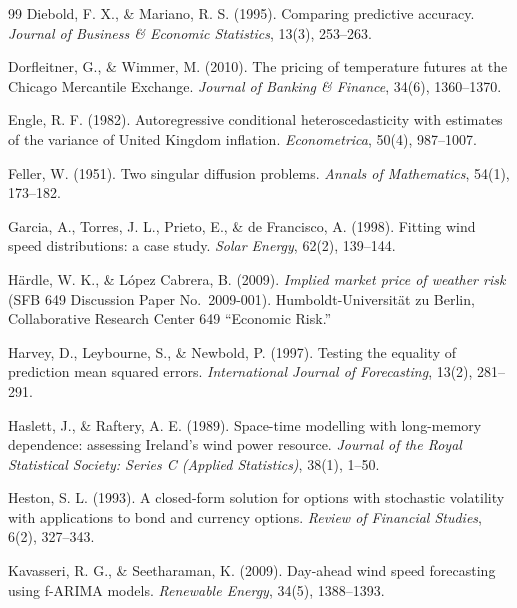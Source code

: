 \begin{thebibliography}{99}
Diebold, F. X., \& Mariano, R. S. (1995).
Comparing predictive accuracy.
\textit{Journal of Business \& Economic Statistics}, 13(3), 253--263.

Dorfleitner, G., \& Wimmer, M. (2010).
The pricing of temperature futures at the Chicago Mercantile Exchange.
\textit{Journal of Banking \& Finance}, 34(6), 1360--1370.

Engle, R. F. (1982).
Autoregressive conditional heteroscedasticity with estimates of the variance of United Kingdom inflation.
\textit{Econometrica}, 50(4), 987--1007.

Feller, W. (1951).
Two singular diffusion problems.
\textit{Annals of Mathematics}, 54(1), 173--182.

Garcia, A., Torres, J. L., Prieto, E., \& de Francisco, A. (1998).
Fitting wind speed distributions: a case study.
\textit{Solar Energy}, 62(2), 139--144.

H\"ardle, W. K., \& L\'opez Cabrera, B. (2009).
\textit{Implied market price of weather risk} (SFB 649 Discussion Paper No.\ 2009-001).
Humboldt-Universit\"at zu Berlin, Collaborative Research Center 649 ``Economic Risk.''

Harvey, D., Leybourne, S., \& Newbold, P. (1997).
Testing the equality of prediction mean squared errors.
\textit{International Journal of Forecasting}, 13(2), 281--291.

Haslett, J., \& Raftery, A. E. (1989).
Space-time modelling with long-memory dependence: assessing Ireland's wind power resource.
\textit{Journal of the Royal Statistical Society: Series C (Applied Statistics)}, 38(1), 1--50.

Heston, S. L. (1993).
A closed-form solution for options with stochastic volatility with applications to bond and currency options.
\textit{Review of Financial Studies}, 6(2), 327--343.

Kavasseri, R. G., \& Seetharaman, K. (2009).
Day-ahead wind speed forecasting using f-ARIMA models.
\textit{Renewable Energy}, 34(5), 1388--1393.


\end{thebibliography}
